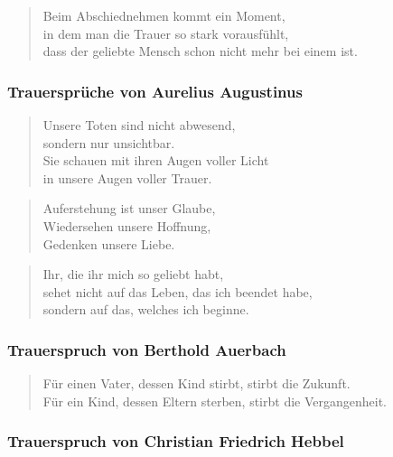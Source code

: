 \documentclass[ngerman,a4paper,11pt]{scrreprt}
\begin{document}
\begin{verse}
Beim Abschiednehmen kommt ein Moment, \\
in dem man die Trauer so stark vorausfühlt, \\
dass der geliebte Mensch schon nicht mehr bei einem ist. \\
\end{verse}

\subsubsection*{Trauersprüche von Aurelius Augustinus}
\label{sec-2-1-2-3-6}

\begin{verse}
Unsere Toten sind nicht abwesend, \\
sondern nur unsichtbar. \\
Sie schauen mit ihren Augen voller Licht \\
in unsere Augen voller Trauer. \\
\end{verse}

\begin{verse}
Auferstehung ist unser Glaube, \\
Wiedersehen unsere Hoffnung, \\
Gedenken unsere Liebe. \\
\end{verse}

\begin{verse}
Ihr, die ihr mich so geliebt habt, \\
sehet nicht auf das Leben, das ich beendet habe, \\
sondern auf das, welches ich beginne. \\
\end{verse}

\subsubsection*{Trauerspruch von Berthold Auerbach}
\label{sec-2-1-2-3-7}

\begin{verse}
Für einen Vater, dessen Kind stirbt, stirbt die Zukunft. \\
Für ein Kind, dessen Eltern sterben, stirbt die Vergangenheit. \\
\end{verse}

\subsubsection*{Trauerspruch von Christian Friedrich Hebbel}
\label{sec-2-1-2-3-8}
\end{document}
